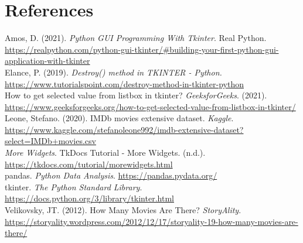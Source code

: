 \documentclass[fontsize=11pt]{article}
\begin{document}
\section*{References}
Amos, D. (2021). \textit{Python GUI Programming With Tkinter}. Real Python. \url{https://realpython.com/python-gui-tkinter/#building-your-first-python-gui-application-with-tkinter}\\

Elance, P. (2019). \textit{Destroy() method in TKINTER - Python.} \url{https://www.tutorialspoint.com/destroy-method-in-tkinter-python}\\

How to get selected value from listbox in tkinter? \textit{GeeksforGeeks}. (2021). \url{https://www.geeksforgeeks.org/how-to-get-selected-value-from-listbox-in-tkinter/}\\

Leone, Stefano. (2020). IMDb movies extensive dataset. \textit{Kaggle}. \url{https://www.kaggle.com/stefanoleone992/imdb-extensive-dataset?select=IMDb+movies.csv}\\

\textit{More Widgets}. TkDocs Tutorial - More Widgets. (n.d.). \url{https://tkdocs.com/tutorial/morewidgets.html}\\

pandas. \textit{Python Data Analysis}. \url{https://pandas.pydata.org/}\\

tkinter. \textit{The Python Standard Library}. \url{https://docs.python.org/3/library/tkinter.html}\\

Velikovsky, JT. (2012). How Many Movies Are There? \textit{StoryAlity}. \url{https://storyality.wordpress.com/2012/12/17/storyality-19-how-many-movies-are-there/}\\
\end{document}
